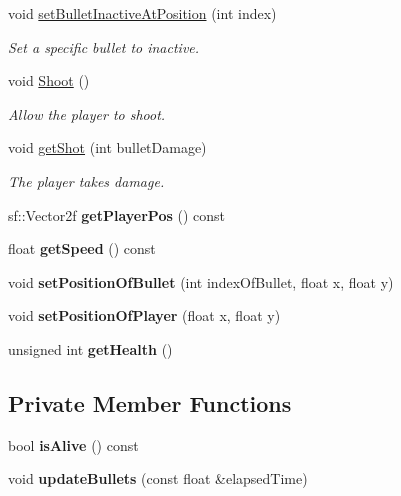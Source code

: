 \begin{DoxyCompactItemize}
void \hyperlink{class_player_a4a72b5ba696e55375ee614ef89a87ade}{set\+Bullet\+Inactive\+At\+Position} (int index)
\begin{DoxyCompactList}\small\item\em Set a specific bullet to inactive. \end{DoxyCompactList}\item 
void \hyperlink{class_player_a2105394431517a41d38140cb65982331}{Shoot} ()
\begin{DoxyCompactList}\small\item\em Allow the player to shoot. \end{DoxyCompactList}\item 
void \hyperlink{class_player_a13e6164daf86c00800992d756339fe51}{get\+Shot} (int bullet\+Damage)
\begin{DoxyCompactList}\small\item\em The player takes damage. \end{DoxyCompactList}\item 
\mbox{\label{class_player_aab8a89629ae8acaf8c1dc4b2e9f052c6}} 
sf\+::\+Vector2f {\bfseries get\+Player\+Pos} () const
\item 
\mbox{\label{class_player_a515920b9f3992375f179ca17ee750dc1}} 
float {\bfseries get\+Speed} () const
\item 
\mbox{\label{class_player_a3bf9c265d1be1284501b8c03ca5bdfb0}} 
void {\bfseries set\+Position\+Of\+Bullet} (int index\+Of\+Bullet, float x, float y)
\item 
\mbox{\label{class_player_abeaa59ae6cd6ca74f269f4af28ef8f82}} 
void {\bfseries set\+Position\+Of\+Player} (float x, float y)
\item 
\mbox{\label{class_player_a1f61cee0029ef492d13e289f34e7764b}} 
unsigned int {\bfseries get\+Health} ()
\end{DoxyCompactItemize}
\subsection*{Private Member Functions}
\begin{DoxyCompactItemize}
\item 
\mbox{\label{class_player_a3966588630ad0a127c9250f985865392}} 
bool {\bfseries is\+Alive} () const
\item 
\mbox{\label{class_player_a66534b1473c5f9288ae8cd7001738ff9}} 
void {\bfseries update\+Bullets} (const float \&elapsed\+Time)
\end{DoxyCompactItemize}
